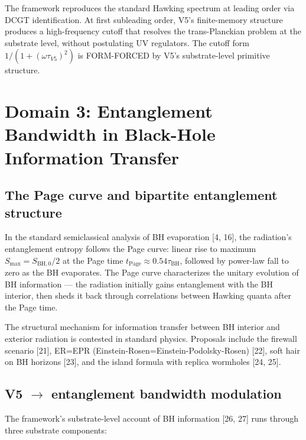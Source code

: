 \documentclass[11pt,a4paper]{article}
\begin{document}
The framework reproduces the standard Hawking spectrum at leading order via DCGT identification. At first subleading order, V5's finite-memory structure produces a high-frequency cutoff that resolves the trans-Planckian problem at the substrate level, without postulating UV regulators. The cutoff form $1/(1+(\omega\tau_{V5})^{2})$ is FORM-FORCED by V5's substrate-level primitive structure.

\section{Domain 3: Entanglement Bandwidth in Black-Hole Information Transfer}

\subsection{The Page curve and bipartite entanglement structure}

In the standard semiclassical analysis of BH evaporation [4, 16], the radiation's entanglement entropy follows the Page curve: linear rise to maximum $S_\mathrm{max} = S_{\mathrm{BH,0}}/2$ at the Page time $t_\mathrm{Page} \approx 0.54 \tau_\mathrm{BH}$, followed by power-law fall to zero as the BH evaporates. The Page curve characterizes the unitary evolution of BH information --- the radiation initially gains entanglement with the BH interior, then sheds it back through correlations between Hawking quanta after the Page time.

The structural mechanism for information transfer between BH interior and exterior radiation is contested in standard physics. Proposals include the firewall scenario [21], ER=EPR (Einstein-Rosen=Einstein-Podolsky-Rosen) [22], soft hair on BH horizons [23], and the island formula with replica wormholes [24, 25].

\subsection{V5 $\to$ entanglement bandwidth modulation}

The framework's substrate-level account of BH information [26, 27] runs through three substrate components:
\end{document}
